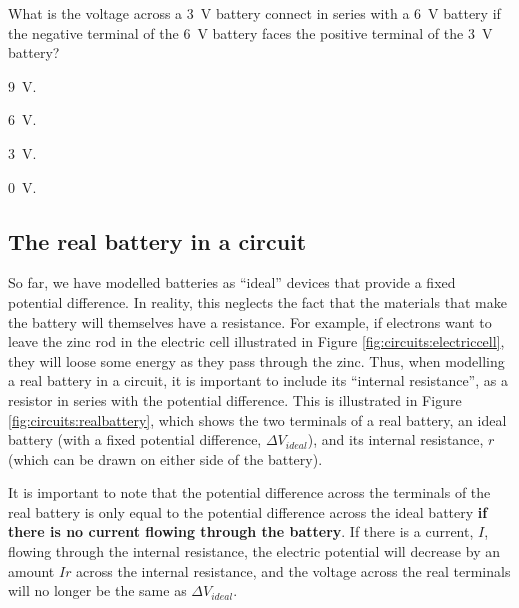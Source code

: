 \begin{checkpoint}{}
	\begin{MCquestion}{What is the voltage across a \SI{3}{V} battery connect in series with a \SI{6}{V} battery if the negative terminal of the \SI{6}{V} battery faces the positive terminal of the \SI{3}{V} battery?}
\item \SI{9}{V}. \correct
\item \SI{6}{V}.
\item \SI{3}{V}.
\item \SI{0}{V}.
	\end{MCquestion}
\end{checkpoint}

\subsection{The real battery in a circuit}
So far, we have modelled batteries as ``ideal'' devices that provide a fixed potential difference. In reality, this neglects the fact that the materials that make the battery will themselves have a resistance. For example, if electrons want to leave the zinc rod in the electric cell illustrated in Figure \ref{fig:circuits:electriccell}, they will loose some energy as they pass through the zinc. Thus, when modelling a real battery in a circuit, it is important to include its ``internal resistance'', as a resistor in series with the potential difference. This is illustrated in Figure \ref{fig:circuits:realbattery}, which shows the two terminals of a real battery, an ideal battery (with a fixed potential difference, $\Delta V_{ideal}$), and its internal resistance, $r$ (which can be drawn on either side of the battery). 


It is important to note that the potential difference across the terminals of the real battery is only equal to the potential difference across the ideal battery \textbf{if there is no current flowing through the battery}. If there is a current, $I$, flowing through the internal resistance, the electric potential will decrease by an amount $Ir$ across the internal resistance, and the voltage across the real terminals will no longer be the same as $\Delta V_{ideal}$. 

